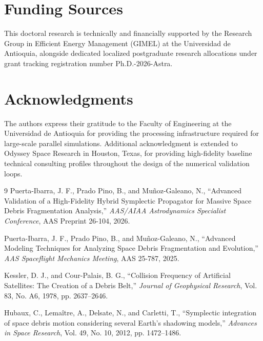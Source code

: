 \documentclass[11pt,letterpaper]{article}
\begin{document}
\section*{Funding Sources}
This doctoral research is technically and financially supported by the Research Group in Efficient Energy Management (GIMEL) at the Universidad de Antioquia, alongside dedicated localized postgraduate research allocations under grant tracking registration number Ph.D.-2026-Astra.


\section*{Acknowledgments}
The authors express their gratitude to the Faculty of Engineering at the Universidad de Antioquia for providing the processing infrastructure required for large-scale parallel simulations. Additional acknowledgment is extended to Odyssey Space Research in Houston, Texas, for providing high-fidelity baseline technical consulting profiles throughout the design of the numerical validation loops.

\begin{thebibliography}{9}
Puerta-Ibarra, J. F., Prado Pino, B., and Muñoz-Galeano, N., ``Advanced Validation of a High-Fidelity Hybrid Symplectic Propagator for Massive Space Debris Fragmentation Analysis,'' \emph{AAS/AIAA Astrodynamics Specialist Conference}, AAS Preprint 26-104, 2026.

Puerta-Ibarra, J. F., Prado Pino, B., and Muñoz-Galeano, N., ``Advanced Modeling Techniques for Analyzing Space Debris Fragmentation and Evolution,'' \emph{AAS Spaceflight Mechanics Meeting}, AAS 25-787, 2025.

Kessler, D. J., and Cour-Palais, B. G., ``Collision Frequency of Artificial Satellites: The Creation of a Debris Belt,'' \emph{Journal of Geophysical Research}, Vol. 83, No. A6, 1978, pp. 2637--2646.

Hubaux, C., Lemaître, A., Delsate, N., and Carletti, T., ``Symplectic integration of space debris motion considering several Earth's shadowing models,'' \emph{Advances in Space Research}, Vol. 49, No. 10, 2012, pp. 1472--1486.
\end{thebibliography}
\end{document}
